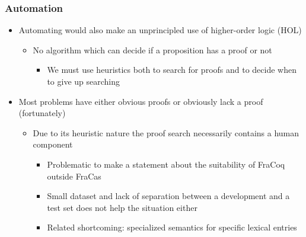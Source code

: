 \documentclass[11pt]{beamer}
\begin{document}
\begin{frame}[fragile]
	\frametitle{Automation}
	
	\begin{itemize}
		
		\item Automating would also make an unprincipled use of
		higher-order logic (HOL)
		
			\begin{itemize}
				
				\item No algorithm which
				can decide if a proposition has a proof or not


\begin{itemize}
	
	\item We
	must use heuristics both to search for proofs and to decide when to
	give up searching


\end{itemize}\end{itemize}

\item  Most problems have either
obvious proofs or obviously lack a proof (fortunately)

\begin{itemize}
	
	\item Due to its heuristic nature the
	proof search necessarily contains a human component
	
	\begin{itemize}
		
		\item Problematic to make a statement about the suitability of FraCoq
		outside FraCas
		
		
		\item Small dataset and lack of separation between a development and a test set does not help the situation either
		
		\item Related shortcoming: specialized semantics for specific lexical entries
		
		
\end{itemize}\end{itemize}\end{itemize}

\end{frame}	
\end{document}
